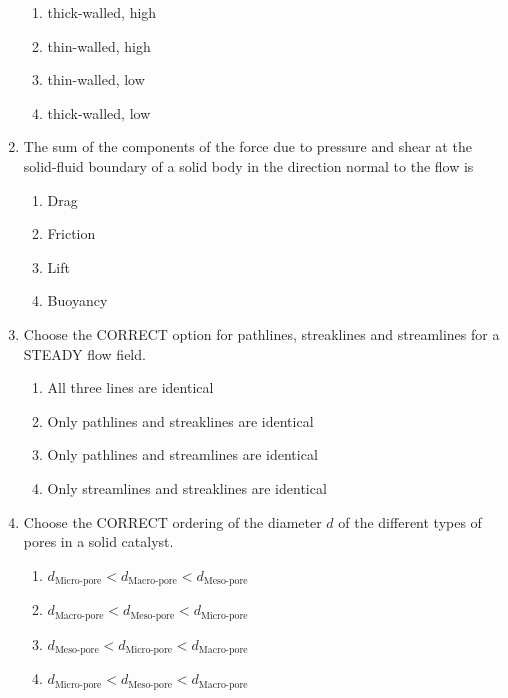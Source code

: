 \documentclass[journal,12pt,onecolumn]{IEEEtran}
\theoremstyle{remark}
\begin{document}
\begin{enumerate}
		\hfill{}
		
		\begin{enumerate}
			\item {} thick-walled,  high
			\item {} thin-walled,  high
			\item {} thin-walled,  low
			\item {} thick-walled,  low
		\end{enumerate}
		
		\item The sum of the components of the force due to pressure and shear at the solid-fluid boundary of a solid body in the direction normal to the flow is
		
		\hfill{}
		
		\begin{multicols}{2}
			\begin{enumerate}
				\item Drag
				\item Friction
				\item Lift
				\item Buoyancy
			\end{enumerate}
		\end{multicols}
		
		\item Choose the CORRECT option for pathlines, streaklines and streamlines for a STEADY flow field.
		
		\hfill{}
		
		\begin{enumerate}
			\item All three lines are identical
			\item Only pathlines and streaklines are identical
			\item Only pathlines and streamlines are identical
			\item Only streamlines and streaklines are identical
		\end{enumerate}
		
		\item Choose the CORRECT ordering of the diameter $d$ of the different types of pores in a solid catalyst.
		
		\hfill{}
		
		\begin{enumerate}
			\item $d_{\text{Micro-pore}} < d_{\text{Macro-pore}} < d_{\text{Meso-pore}}$
			\item $d_{\text{Macro-pore}} < d_{\text{Meso-pore}} < d_{\text{Micro-pore}}$
			\item $d_{\text{Meso-pore}} < d_{\text{Micro-pore}} < d_{\text{Macro-pore}}$
			\item $d_{\text{Micro-pore}} < d_{\text{Meso-pore}} < d_{\text{Macro-pore}}$
		\end{enumerate}
		

\end{enumerate}
\end{document}
